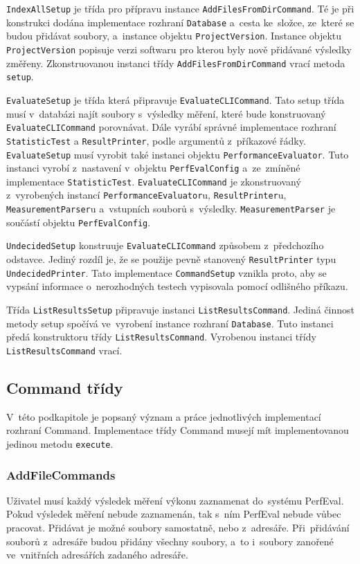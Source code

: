 \lstinline{IndexAllSetup} je třída pro přípravu instance \lstinline{AddFilesFromDirCommand}. Té je při konstrukci dodána
implementace rozhraní \lstinline{Database} a~cesta ke~složce, ze~které se budou přidávat soubory,
a~instance objektu \lstinline{ProjectVersion}. Instance objektu \lstinline{ProjectVersion} popisuje verzi softwaru pro kterou
byly nově přidávané výsledky změřeny. Zkonstruovanou instanci třídy \lstinline{AddFilesFromDirCommand} vrací metoda \lstinline{setup}.

\lstinline{EvaluateSetup} je třída která připravuje \lstinline{EvaluateCLICommand}. Tato setup třída musí v~databázi najít
soubory s~výsledky měření, které bude konstruovaný \lstinline{EvaluateCLICommand} porovnávat. Dále vyrábí správné
implementace rozhraní \lstinline{StatisticTest} a \lstinline{ResultPrinter}, podle argumentů z~příkazové řádky.
\lstinline{EvaluateSetup} musí vyrobit také instanci objektu \lstinline{PerformanceEvaluator}. Tuto instanci vyrobí
z~nastavení v~objektu \lstinline{PerfEvalConfig} a~ze~zmíněné implementace \lstinline{StatisticTest}. \lstinline{EvaluateCLICommand} je zkonstruovaný
z~vyrobených instancí \lstinline{PerformanceEvaluator}u, \lstinline{ResultPrinter}u, \lstinline{MeasurementParser}u a~vstupních souborů s~výsledky.
\lstinline{MeasurementParser} je součástí objektu \lstinline{PerfEvalConfig}.

\lstinline{UndecidedSetup} konstruuje \lstinline{EvaluateCLICommand} způsobem z~předchozího odstavce.
Jediný rozdíl je, že se použije pevně stanovený \lstinline{ResultPrinter} typu \lstinline{UndecidedPrinter}.
Tato implementace \lstinline{CommandSetup} vznikla proto, aby se vypsání informace o~nerozhodných
testech vypisovala pomocí odlišného příkazu.

Třída \lstinline{ListResultsSetup} připravuje instanci \lstinline{ListResultsCommand}. Jediná činnost metody setup
spočívá ve~vyrobení instance rozhraní \lstinline{Database}. Tuto instanci předá konstruktoru
třídy \lstinline{ListResultsCommand}. Vyrobenou instanci třídy \lstinline{ListResultsCommand} vrací.

\subsection{Command třídy}

V~této podkapitole je popsaný význam a práce jednotlivých implementací rozhraní Command.
Implementace třídy Command musejí mít implementovanou jedinou metodu \lstinline{execute}.

\subsubsection{AddFileCommands}
Uživatel musí každý výsledek měření výkonu zaznamenat do~systému PerfEval. Pokud výsledek měření nebude zaznamenán, tak s~ním
PerfEval nebude vůbec pracovat. Přidávat je možné soubory samostatně, nebo z~adresáře. Při~přidávání souborů z~adresáře budou
přidány všechny soubory, a~to i~soubory zanořené ve~vnitřních adresářích zadaného adresáře.

